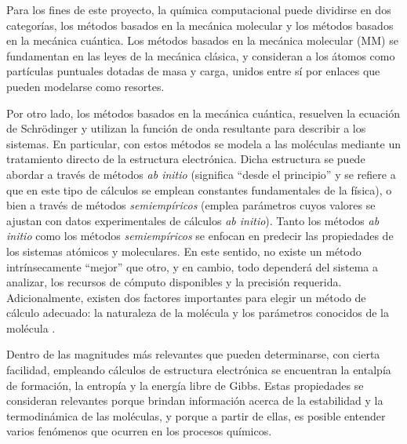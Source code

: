\documentclass[12pt]{article}
\begin{document}
Para los fines de este proyecto, la química computacional puede dividirse en dos categorías, los métodos basados en la mecánica molecular y los métodos basados en la mecánica cuántica.
Los métodos basados en la mecánica molecular (MM) se fundamentan en las leyes de la mecánica
clásica, y consideran a los átomos como partículas puntuales dotadas de masa y carga, unidos
entre sí por enlaces que pueden modelarse como resortes.

Por otro lado, los métodos basados en la mecánica cuántica, resuelven la ecuación de Schrödinger
y utilizan la función de onda resultante
para describir a los sistemas.
En particular, con estos métodos se modela a las moléculas mediante un tratamiento directo
de la estructura electrónica. Dicha estructura se puede abordar a través de métodos
\textit{ab initio} (significa ``desde el principio'' y se refiere a que en
este tipo de cálculos se emplean constantes fundamentales de la física),
o bien a través de métodos  \textit{semiempíricos} (emplea parámetros cuyos valores se ajustan con
datos experimentales de cálculos \textit{ab initio}). Tanto los métodos \textit{ab initio} como los
métodos \textit{semiempíricos} se enfocan en predecir las propiedades de los sistemas atómicos y
moleculares. En este sentido, no existe un método intrínsecamente ``mejor'' que otro, y en cambio,
todo dependerá del sistema a analizar, los recursos de cómputo disponibles y la precisión requerida. Adicionalmente, existen dos factores importantes para elegir un método de cálculo adecuado: la naturaleza de la molécula y los parámetros conocidos de la molécula \cite{Cuevas2003}. 

Dentro de las magnitudes más relevantes que pueden determinarse, con cierta facilidad, empleando
cálculos de estructura electrónica se encuentran la entalpía de formación, la entropía
y la energía libre de Gibbs. Estas propiedades se consideran relevantes porque brindan información acerca de la estabilidad y la termodinámica de las moléculas, y porque a partir de ellas, es posible entender varios fenómenos que ocurren en los procesos químicos.
\end{document}
